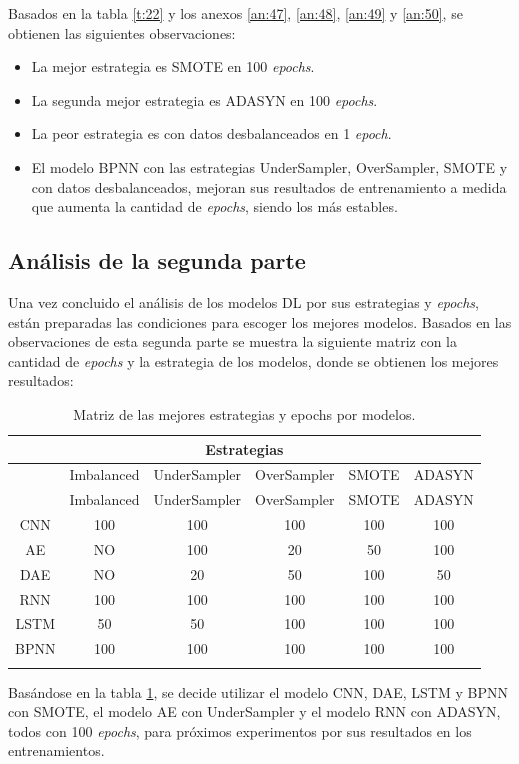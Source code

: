 Basados en la tabla \ref{t:22} y los anexos \ref{an:47}, \ref{an:48}, \ref{an:49} y \ref{an:50}, se obtienen las siguientes observaciones:
\begin{itemize}
	\item La mejor estrategia es SMOTE en 100 \textit{epochs}.
	\item La segunda mejor estrategia es ADASYN en 100 \textit{epochs}.
	\item La peor estrategia es con datos desbalanceados en 1 \textit{epoch}.
	\item El modelo BPNN con las estrategias UnderSampler, OverSampler, SMOTE y con datos desbalanceados, mejoran sus resultados de entrenamiento a medida que aumenta la cantidad de \textit{epochs}, siendo los m\'{a}s estables.
\end{itemize}

\subsection{An\'{a}lisis de la segunda parte}
  Una vez concluido el an\'{a}lisis de los modelos DL por sus estrategias y \textit{epochs}, est\'{a}n preparadas las condiciones para escoger los mejores modelos. Basados en las observaciones de esta segunda parte se muestra la siguiente matriz con la cantidad de \textit{epochs} y la estrategia de los modelos, donde se obtienen los mejores resultados:

\begin{longtable}{|c|c|c|c|c|c|}
	\hline
	\multicolumn{6}{|c|}{Estrategias}\\ \hline
	\space & Imbalanced & UnderSampler & OverSampler & SMOTE & ADASYN\\ \hline
	\endfirsthead
	\hline
	\space & Imbalanced & UnderSampler & OverSampler & SMOTE & ADASYN\\ \hline
	\endhead
	CNN & 100 & 100 & 100 & 100 & 100\\ \hline
	AE & NO & 100 & 20 & 50 & 100\\ \hline
	DAE & NO & 20 & 50 & 100 & 50\\ \hline
	RNN & 100 & 100 & 100 & 100 & 100\\ \hline
	LSTM & 50 & 50 & 100 & 100 & 100\\ \hline
	BPNN & 100 & 100 & 100 & 100 & 100\\ \hline
	\caption{Matriz de las mejores estrategias y epochs por modelos.}
	\label{t:23}
\end{longtable}

  Bas\'{a}ndose en la tabla \ref{t:23}, se decide utilizar el modelo CNN, DAE, LSTM y BPNN con SMOTE, el modelo AE con UnderSampler y el modelo RNN con ADASYN, todos con 100 \textit{epochs}, para pr\'{o}ximos experimentos por sus resultados en los entrenamientos.
  
